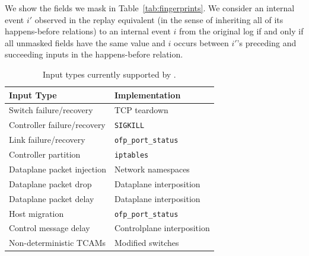 We show the fields we mask in Table~\ref{tab:fingerprints}. We consider an
internal event $i'$ observed in the replay
equivalent (in the sense of inheriting all of its happens-before relations) to an internal
event $i$ from the original log if and only if all unmasked fields have the same value
and $i$ occurs between $i'$'s preceding and succeeding inputs in the
happens-before relation.

\begin{table}[tb]
\centering
\footnotesize
\begin{tabular}{|l|l|}
\hline
\textbf{Input Type} & \textbf{Implementation} \\
\hline
\hline
Switch failure/recovery & TCP teardown \\
\hline
Controller failure/recovery & \verb=SIGKILL= \\
\hline
Link failure/recovery & \verb=ofp_port_status= \\
\hline
Controller partition & \verb=iptables= \\
\hline
Dataplane packet injection & Network namespaces \\
\hline
Dataplane packet drop & Dataplane interposition \\
\hline
Dataplane packet delay & Dataplane interposition \\
\hline
Host migration & \verb=ofp_port_status= \\
\hline
Control message delay & Controlplane interposition \\
\hline
Non-deterministic TCAMs & Modified switches \\
\hline
\end{tabular}
\caption{Input types currently supported by \projectname.}
\label{tab:inputs}
\vspace{-0.2cm}
\end{table}


